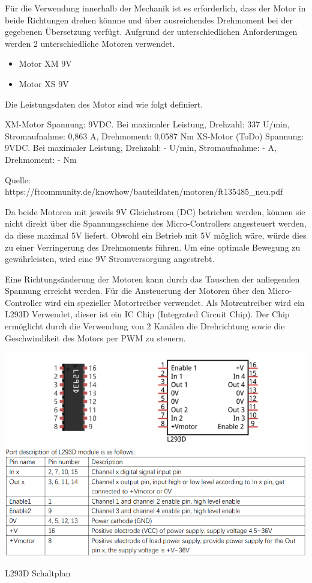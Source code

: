 \documentclass[conference,compsoc,final,a4paper]{IEEEtran}
\begin{document}
Für die Verwendung innerhalb der Mechanik ist es erforderlich, dass der Motor in beide Richtungen drehen könnne und über ausreichendes Drehmoment bei der gegebenen Übersetzung verfügt.
Aufgrund der unterschiedlichen Anforderungen werden 2 unterschiedliche Motoren verwendet.
\begin{itemize}
\item Motor XM 9V
\item Motor XS 9V
\end{itemize}

Die Leistungsdaten des Motor sind wie folgt definiert.

XM-Motor
Spannung: 9VDC. Bei maximaler Leistung, Drehzahl: 337 U/min, Stromaufnahme: 0,863 A, Drehmoment: 0,0587 Nm
XS-Motor (ToDo)
Spannung: 9VDC. Bei maximaler Leistung, Drehzahl: - U/min, Stromaufnahme: - A, Drehmoment: - Nm

Quelle: https://ftcommunity.de/knowhow/bauteildaten/motoren/ft135485_neu.pdf

Da beide Motoren mit jeweils 9V Gleichstrom (DC) betrieben werden, können sie nicht direkt über die Spannungsschiene des Micro-Controllers angesteuert werden, 
da diese maximal 5V liefert. Obwohl ein Betrieb mit 5V möglich wäre, würde dies zu einer Verringerung des Drehmoments führen. Um eine optimale Bewegung zu gewährleisten, 
wird eine 9V Stromversorgung angestrebt. 

Eine Richtungsänderung der Motoren kann durch das Tauschen der anliegenden Spannung erreicht werden.  
Für die Ansteuerung der Motoren über den Micro-Controller wird ein spezieller Motortreiber verwendet. Als Motrentreiber wird ein L293D Verwendet, 
dieser ist ein IC Chip (Integrated Circuit Chip). Der Chip ermöglicht durch die Verwendung von 2 Kanälen die Drehrichtung 
sowie die Geschwindikeit des Motors per PWM zu steuern.

\includegraphics{../images/L293D.png}
\caption{L293D Schaltplan}
\label{Elektrik:L293D}
\end{document}
